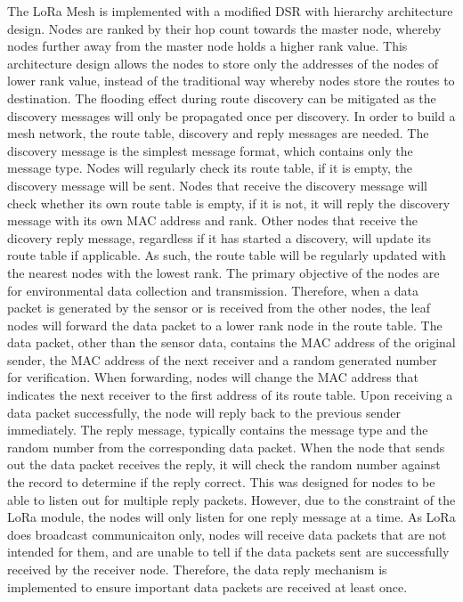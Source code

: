 The LoRa Mesh is implemented with a modified DSR with hierarchy architecture design. Nodes are ranked by their hop count towards the master node, whereby nodes further away from the master node holds a higher rank value. This architecture design allows the nodes to store only the addresses of the nodes of lower rank value, instead of the traditional way whereby nodes store the routes to destination. The flooding effect during route discovery can be mitigated as the discovery messages will only be propagated once per discovery. 
In order to build a mesh network, the route table, discovery and reply messages are needed. The discovery message is the simplest message format, which contains only the message type. Nodes will regularly check its route table, if it is empty, the discovery message will be sent. Nodes that receive the discovery message will check whether its own route table is empty, if it is not, it will reply the discovery message with its own MAC address and rank. Other nodes that receive the dicovery reply message, regardless if it has started a discovery, will update its route table if applicable. As such, the route table will be regularly updated with the nearest nodes with the lowest rank.
The primary objective of the nodes are for environmental data collection and transmission. Therefore, when a data packet is generated by the sensor or is received from the other nodes, the leaf nodes will forward the data packet to a lower rank node in the route table. The data packet, other than the sensor data, contains the MAC address of the original sender, the MAC address of the next receiver and a random generated number for verification. When forwarding, nodes will change the MAC address that indicates the next receiver to the first address of its route table. Upon receiving a data packet successfully, the node will reply back to the previous sender immediately. The reply message, typically contains the message type and the random number from the corresponding data packet. When the node that sends out the data packet receives the reply, it will check the random number against the record to determine if the reply correct. This was designed for nodes to be able to listen out for multiple reply packets. However, due to the constraint of the LoRa module, the nodes will only listen for one reply message at a time. As LoRa does broadcast communicaiton only, nodes will receive data packets that are not intended for them, and are unable to tell if the data packets sent are successfully received by the receiver node. Therefore, the data reply mechanism is implemented to ensure important data packets are received at least once.
